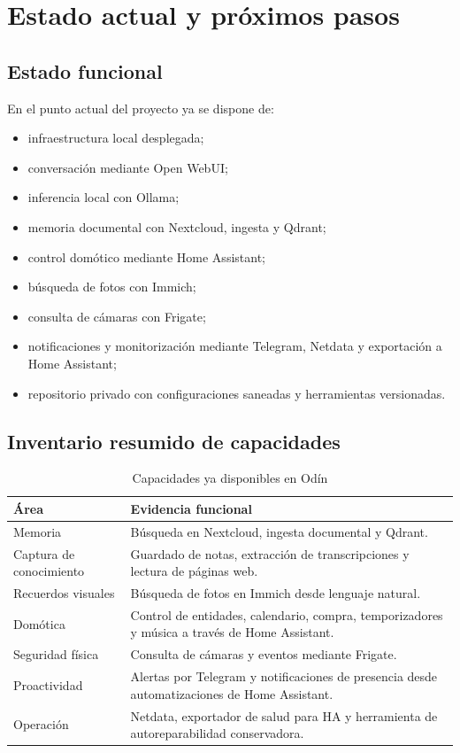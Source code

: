 \chapter{Estado actual y próximos pasos}

\section{Estado funcional}
En el punto actual del proyecto ya se dispone de:
\begin{itemize}
  \item infraestructura local desplegada;
  \item conversación mediante Open WebUI;
  \item inferencia local con Ollama;
  \item memoria documental con Nextcloud, ingesta y Qdrant;
  \item control domótico mediante Home Assistant;
  \item búsqueda de fotos con Immich;
  \item consulta de cámaras con Frigate;
  \item notificaciones y monitorización mediante Telegram, Netdata y exportación a Home Assistant;
  \item repositorio privado con configuraciones saneadas y herramientas versionadas.
\end{itemize}

\section{Inventario resumido de capacidades}
\begin{table}[H]
  \centering
  \caption{Capacidades ya disponibles en Odín}
  \label{tab:capacidades-odin-seguimiento}
  \begin{tabularx}{\textwidth}{lX}
    \toprule
    Área & Evidencia funcional \\
    \midrule
    Memoria & Búsqueda en Nextcloud, ingesta documental y Qdrant. \\
    Captura de conocimiento & Guardado de notas, extracción de transcripciones y lectura de páginas web. \\
    Recuerdos visuales & Búsqueda de fotos en Immich desde lenguaje natural. \\
    Domótica & Control de entidades, calendario, compra, temporizadores y música a través de Home Assistant. \\
    Seguridad física & Consulta de cámaras y eventos mediante Frigate. \\
    Proactividad & Alertas por Telegram y notificaciones de presencia desde automatizaciones de Home Assistant. \\
    Operación & Netdata, exportador de salud para HA y herramienta de autoreparabilidad conservadora. \\
    \bottomrule
  \end{tabularx}
\end{table}

